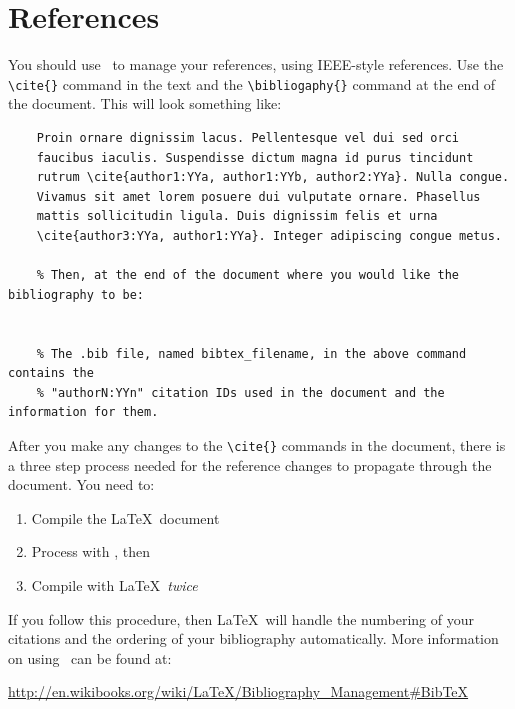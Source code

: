 \documentclass[11pt]{article}
\begin{document}
\section{References}
\label{sec:references}
\vspace{-0.2in}
%
You should use \BibTeX\ to manage your references, using IEEE-style references. Use the {\tt \textbackslash cite\{\}} command in the text and the {\tt \textbackslash bibliogaphy\{\}} command at the end of the document. This will look something like:
%
	\begin{verbatim}
	Proin ornare dignissim lacus. Pellentesque vel dui sed orci
	faucibus iaculis. Suspendisse dictum magna id purus tincidunt
	rutrum \cite{author1:YYa, author1:YYb, author2:YYa}. Nulla congue.
	Vivamus sit amet lorem posuere dui vulputate ornare. Phasellus
	mattis sollicitudin ligula. Duis dignissim felis et urna
	\cite{author3:YYa, author1:YYa}. Integer adipiscing congue metus.

	% Then, at the end of the document where you would like the bibliography to be:
	
	
	% The .bib file, named bibtex_filename, in the above command contains the  
	% "authorN:YYn" citation IDs used in the document and the information for them.

	\end{verbatim}
%
\vspace{-0.2in}
After you make any changes to the {\tt \textbackslash cite\{\}} commands in the document, there is a three step process needed for the reference changes to propagate through the document. You need to:
	\vspace{-0.2in}
	\begin{enumerate}
		\item Compile the \LaTeX\ document
		\item Process with \BibTeX, then
		\item Compile with \LaTeX\ \textit{twice}
	\end{enumerate}
	\vspace{-0.2in}
If you follow this procedure, then \LaTeX\ will handle the numbering of your citations and the ordering of your bibliography automatically. More information on using \BibTeX\ can be found at:

\hspace{0.25in}\url{http://en.wikibooks.org/wiki/LaTeX/Bibliography_Management#BibTeX}
\end{document}
